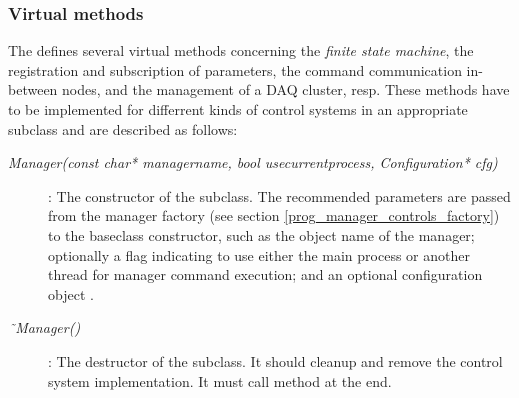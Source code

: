 \subsubsection{Virtual methods}
The  defines several virtual methods concerning the {\em finite state machine},
the registration and subscription of parameters, the command communication
in-between nodes, and the management of a DAQ cluster, resp.
These methods have to be implemented for differrent kinds of control systems in
an appropriate subclass and are described as follows:

\begin{description}

\item[\em Manager(const char* managername,  bool usecurrentprocess, Configuration* cfg)] :
The constructor of the subclass. The recommended parameters 
are passed from the manager factory (see section \ref{prog_manager_controls_factory})
to the baseclass constructor, such as
the object name of the manager; optionally a
flag indicating to use either the main process or another thread for manager 
command execution;
and an optional configuration object .


     
\item[\em\~{~}Manager()] :
The destructor of the subclass. It should cleanup and remove the  
control system implementation. It must call method 
at the end.    



\end{description}
